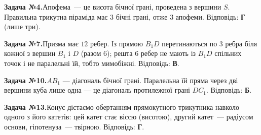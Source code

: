 \documentclass[12pt]{article}
\begin{document}
\par\vspace{0.3cm}\noindent\hypertarget{sol:4}{}
\begin{tcolorbox}[colback=titleBg!40, colframe=mainGreen!55, boxrule=0.4pt, arc=2pt, left=6pt, right=6pt, top=4pt, bottom=4pt, breakable]
\noindent\small\textbf{Задача №4.}\quad Апофема~--- це висота бічної грані, проведена з вершини $S$. Правильна трикутна піраміда має $3$ бічні грані, отже $3$ апофеми. Відповідь: \textbf{Г} (лише три).
\par\vspace{0.1cm}\hfill\hyperlink{task:4}{}
\end{tcolorbox}
\par\vspace{0.3cm}\noindent\hypertarget{sol:7}{}
\begin{tcolorbox}[colback=titleBg!40, colframe=mainGreen!55, boxrule=0.4pt, arc=2pt, left=6pt, right=6pt, top=4pt, bottom=4pt, breakable]
\noindent\small\textbf{Задача №7.}\quad Призма має $12$ ребер. Із прямою $B_1D$ перетинаються по $3$ ребра біля кожної з вершин $B_1$ і $D$ (разом $6$); решта $6$ ребер не мають із $B_1D$ спільних точок і не паралельні їй, тобто мимобіжні. Відповідь: \textbf{В}.
\par\vspace{0.1cm}\hfill\hyperlink{task:7}{}
\end{tcolorbox}
\par\vspace{0.3cm}\noindent\hypertarget{sol:10}{}
\begin{tcolorbox}[colback=titleBg!40, colframe=mainGreen!55, boxrule=0.4pt, arc=2pt, left=6pt, right=6pt, top=4pt, bottom=4pt, breakable]
\noindent\small\textbf{Задача №10.}\quad $AB_1$ --- діагональ бічної грані. Паралельна їй пряма через дві вершини куба лише одна --- це діагональ протилежної грані $DC_1$. Відповідь: \textbf{Б}.
\par\vspace{0.1cm}\hfill\hyperlink{task:10}{}
\end{tcolorbox}
\par\vspace{0.3cm}\noindent\hypertarget{sol:13}{}
\begin{tcolorbox}[colback=titleBg!40, colframe=mainGreen!55, boxrule=0.4pt, arc=2pt, left=6pt, right=6pt, top=4pt, bottom=4pt, breakable]
\noindent\small\textbf{Задача №13.}\quad Конус дістаємо обертанням прямокутного трикутника навколо одного з його катетів: цей катет стає віссю (висотою), другий катет~--- радіусом основи, гіпотенуза~--- твірною. Відповідь: \textbf{Г}.
\par\vspace{0.1cm}\hfill\hyperlink{task:13}{}
\end{tcolorbox}
\end{document}
